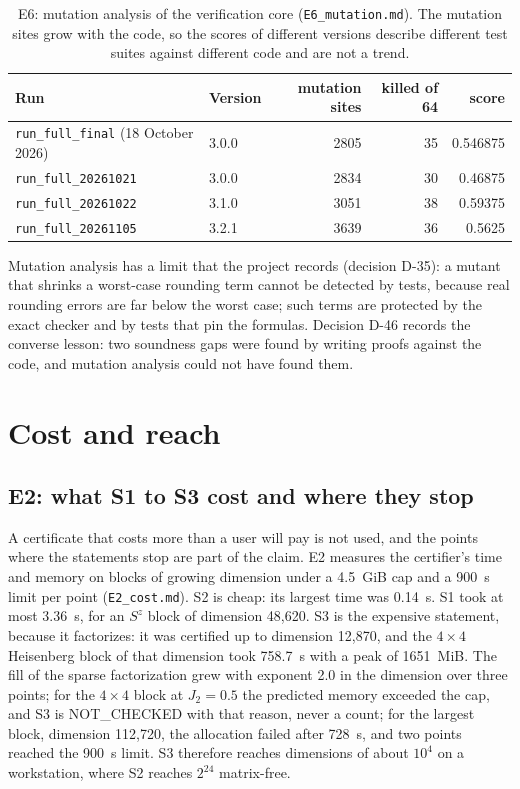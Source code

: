 \documentclass[11pt,a4paper]{article}
\newcommand{\code}[1]{\texttt{#1}}
\newcommand{\status}[1]{\textsf{#1}}
\newcommand{\NC}{\status{NOT\_CHECKED}}
\begin{document}
\begin{table}[ht]
\centering\small
\caption{E6: mutation analysis of the verification core (\code{E6\_mutation.md}). The mutation sites grow with the
code, so the scores of different versions describe different test suites against different code and are not a
trend.}
\label{tab:e6}
\begin{tabular}{@{}llrrr@{}}
\toprule
Run & Version & mutation sites & killed of 64 & score \\
\midrule
\code{run\_full\_final} (18 October 2026) & 3.0.0 & 2805 & 35 & 0.546875 \\
\code{run\_full\_20261021} & 3.0.0 & 2834 & 30 & 0.46875 \\
\code{run\_full\_20261022} & 3.1.0 & 3051 & 38 & 0.59375 \\
\code{run\_full\_20261105} & 3.2.1 & 3639 & 36 & 0.5625 \\
\bottomrule
\end{tabular}
\end{table}

Mutation analysis has a limit that the project records (decision D-35): a mutant that shrinks a worst-case rounding
term cannot be detected by tests, because real rounding errors are far below the worst case; such terms are protected
by the exact checker and by tests that pin the formulas. Decision D-46 records the converse lesson: two soundness gaps
were found by writing proofs against the code, and mutation analysis could not have found them.

\section{Cost and reach}
\label{sec:cost}

\subsection{E2: what S1 to S3 cost and where they stop}

A certificate that costs more than a user will pay is not used, and the points where the statements stop are part of
the claim. E2 measures the certifier's time and memory on blocks of growing dimension under a 4.5~GiB cap and a 900~s
limit per point (\code{E2\_cost.md}). S2 is cheap: its largest time was 0.14~s. S1 took at most 3.36~s, for an $S^z$
block of dimension 48,620. S3 is the expensive statement, because it factorizes: it was certified up to dimension
12,870, and the $4\times4$ Heisenberg block of that dimension took 758.7~s with a peak of 1651~MiB. The fill of the
sparse factorization grew with exponent 2.0 in the dimension over three points; for the $4\times4$ block at $J_2=0.5$
the predicted memory exceeded the cap, and S3 is \NC{} with that reason, never a count; for the largest block,
dimension 112,720, the allocation failed after 728~s, and two points reached the 900~s limit. S3 therefore reaches
dimensions of about $10^4$ on a workstation, where S2 reaches $2^{24}$ matrix-free.
\end{document}
